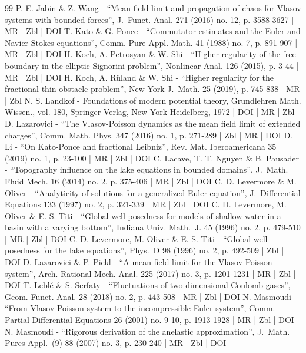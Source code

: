 \documentclass[10pt]{amsart}
\theoremstyle{plain}
\theoremstyle{definition}
\begin{document}
\begin{thebibliography}{99}
P.-E. Jabin \& Z. Wang - “Mean field limit and propagation of chaos for Vlasov systems with bounded forces”, J. Funct. Anal. 271 (2016) no. 12, p. 3588-3627 | MR | Zbl | DOI
T. Kato \& G. Ponce - “Commutator estimates and the Euler and Navier-Stokes equations”, Comm. Pure Appl. Math. 41 (1988) no. 7, p. 891-907 | MR | Zbl | DOI
H. Koch, A. Petrosyan \& W. Shi - “Higher regularity of the free boundary in the elliptic Signorini problem”, Nonlinear Anal. 126 (2015), p. 3-44 | MR | Zbl | DOI
H. Koch, A. Rüland \& W. Shi - “Higher regularity for the fractional thin obstacle problem”, New York J. Math. 25 (2019), p. 745-838 | MR | Zbl
N. S. Landkof - Foundations of modern potential theory, Grundlehren Math. Wissen., vol. 180, Springer-Verlag, New York-Heidelberg, 1972 | DOI | MR | Zbl
D. Lazarovici - “The Vlasov-Poisson dynamics as the mean field limit of extended charges”, Comm. Math. Phys. 347 (2016) no. 1, p. 271-289 | Zbl | MR | DOI
D. Li - “On Kato-Ponce and fractional Leibniz”, Rev. Mat. Iberoamericana 35 (2019) no. 1, p. 23-100 | MR | Zbl | DOI
C. Lacave, T. T. Nguyen \& B. Pausader - “Topography influence on the lake equations in bounded domains”, J. Math. Fluid Mech. 16 (2014) no. 2, p. 375-406 | MR | Zbl | DOI
C. D. Levermore \& M. Oliver - “Analyticity of solutions for a generalized Euler equation”, J. Differential Equations 133 (1997) no. 2, p. 321-339 | MR | Zbl | DOI
C. D. Levermore, M. Oliver \& E. S. Titi - “Global well-posedness for models of shallow water in a basin with a varying bottom”, Indiana Univ. Math. J. 45 (1996) no. 2, p. 479-510 | MR | Zbl | DOI
C. D. Levermore, M. Oliver \& E. S. Titi - “Global well-posedness for the lake equations”, Phys. D 98 (1996) no. 2, p. 492-509 | Zbl | DOI
D. Lazarovici \& P. Pickl - “A mean field limit for the Vlasov-Poisson system”, Arch. Rational Mech. Anal. 225 (2017) no. 3, p. 1201-1231 | MR | Zbl | DOI
T. Leblé \& S. Serfaty - “Fluctuations of two dimensional Coulomb gases”, Geom. Funct. Anal. 28 (2018) no. 2, p. 443-508 | MR | Zbl | DOI
N. Masmoudi - “From Vlasov-Poisson system to the incompressible Euler system”, Comm. Partial Differential Equations 26 (2001) no. 9-10, p. 1913-1928 | MR | Zbl | DOI
N. Masmoudi - “Rigorous derivation of the anelastic approximation”, J. Math. Pures Appl. (9) 88 (2007) no. 3, p. 230-240 | MR | Zbl | DOI

\end{thebibliography}
\end{document}
